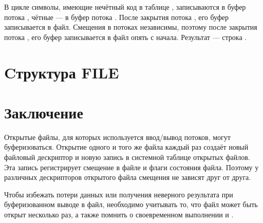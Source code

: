 \documentclass[a4paper,oneside,12pt]{extreport}
\begin{document}
В цикле символы, имеющие нечётный код в таблице , записываются в буфер потока , чётные — в буфер потока .
После закрытия потока , его буфер записывается в файл.
Смещения в потоках независимы, поэтому после закрытия потока , его буфер записывается в файл опять с начала.
Результат — строка .

\section*{Cтруктура FILE}



\section*{Заключение}

Открытые файлы, для которых используется ввод/вывод потоков, могут буферизоваться.
Открытие одного и того же файла каждый раз создаёт новый файловый дескриптор и новую запись в системной таблице открытых файлов.
Эта запись регистрирует смещение в файле и флаги состояния файла.
Поэтому у различных дескрипторов открытого файла смещения не зависят друг от друга.

Чтобы избежать потери данных или получения неверного результата при буферизованном выводе в файл, необходимо учитывать то, что файл может быть открыт несколько раз, а также помнить о своевременном выполнении  и .
\end{document}
